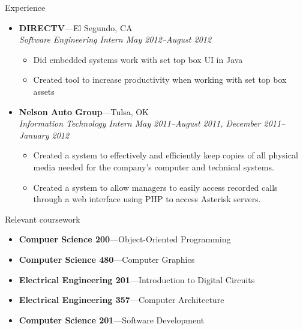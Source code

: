 \documentclass[10pt,oneside]{article}
\newenvironment{ressection}[1]{
	\vspace{4pt}
	{\fontfamily{phv}\selectfont\Large#1}
	\begin{itemize}
	\vspace{3pt}
}{
	\end{itemize}
}
\newcommand{\ressubitem}[1]{
	\vspace{-1pt}
	\item \begin{flushleft} #1 \end{flushleft}
}
\newcommand{\resbigitem}[3]{
	\vspace{-5pt}
	\item
	\textbf{#1}---#2 \\
	\textit{#3}
}
\newcommand{\resshortbigitem}[2]{
	\vspace{-5pt}
	\item
	\textbf{#1}---#2
}
\newenvironment{ressubsec}[3]{
	\resbigitem{#1}{#2}{#3}
	\vspace{-2pt}
	\begin{itemize}
}{
	\end{itemize}
}
\begin{document}
\begin{ressection}{Experience}
	\begin{comment}
	\begin{ressubsec}{Car Country}{Tulsa, OK}{Currier December 2010--January 2011 (Winter Break)}
		\ressubitem{Transported documents and payments to and from businesses and banks.}
	\end{ressubsec}
	\end{comment}
	\begin{ressubsec}{DIRECTV}{El Segundo, CA}{Software Engineering Intern May 2012--August 2012}
		\ressubitem{Did embedded systems work with set top box UI in Java}
		\ressubitem{Created tool to increase productivity when working with set top box assets}
	\end{ressubsec}
	\begin{ressubsec}{Nelson Auto Group}{Tulsa, OK}{Information Technology Intern May 2011--August 2011, December 2011--January 2012}
		\ressubitem{Created a system to effectively and efficiently keep copies of all physical media needed for the company's computer and technical systems.}
		\ressubitem{Created a system to allow managers to easily access recorded calls through a web interface using PHP to access Asterisk servers.}
	\end{ressubsec}

	
	\begin{comment}
	\begin{ressubsec}{Tulsa Day Center For the Homeless}{Tulsa, OK}{Volunteer:  July 2006--September 2009}
		\ressubitem{Worked mainly with individuals receiving tuberculosis tests.}
		\ressubitem{Entered tuberculosis data and kept computerized records between the Day Center for the Homeless and the Tulsa City-County Health Department up to date.}
	\end{ressubsec}
	\end{comment}

\end{ressection}

\begin{ressection}{Relevant coursework}
	\resshortbigitem{Compuer Science 200}{Object-Oriented Programming}
	\resshortbigitem{Computer Science 480}{Computer Graphics}
	\resshortbigitem{Electrical Engineering 201}{Introduction to Digital Circuits}
	\resshortbigitem{ Electrical Engineering 357}{Computer Architecture}
	\resshortbigitem{Computer Science 201}{Software Development}
\end{ressection}
\end{document}
